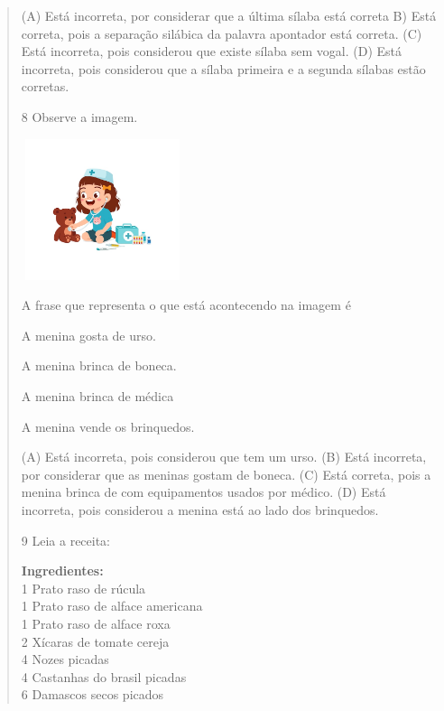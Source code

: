 \begin{verse}
(A) Está incorreta, por considerar que a última sílaba está correta
B) Está correta, pois a separação silábica da palavra apontador está correta.
(C) Está incorreta, pois considerou que existe sílaba sem vogal.
(D) Está incorreta, pois considerou que a sílaba primeira e a segunda sílabas estão corretas.

\num{8} Observe a imagem.

\includegraphics[width=1.87273in,height=1.62645in]{media/image169.jpeg}


A frase que representa o que está acontecendo na imagem é

\begin{escolha}
\item A menina gosta de urso.

\item A menina brinca de boneca.

\item A menina brinca de médica

\item A menina vende os brinquedos.
\end{escolha}


(A) Está incorreta, pois considerou que tem um urso.
(B) Está incorreta, por considerar que as meninas gostam de boneca.
(C) Está correta, pois a menina brinca de com equipamentos usados por médico.
(D) Está incorreta, pois considerou a menina está ao lado dos brinquedos.

\num{9} Leia a receita:

\textbf{Ingredientes:}\\
1 Prato raso de rúcula\\
1 Prato raso de alface americana\\
1 Prato raso de alface roxa\\
2 Xícaras de tomate cereja\\
4 Nozes picadas\\
4 Castanhas do brasil picadas\\
6 Damascos secos picados


\end{verse}
